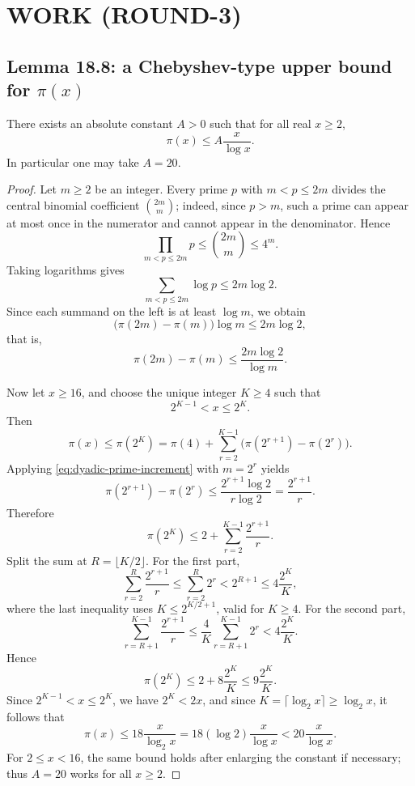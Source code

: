 \section{WORK (ROUND-3)}

\subsection{Lemma 18.8: a Chebyshev-type upper bound for \(\pi(x)\)}

\begin{lemma}[Lemma~18.8]\label{lem:pi-upper}
There exists an absolute constant \(A>0\) such that for all real \(x\ge 2\),
\[
\pi(x) \le A\frac{x}{\log x}.
\]
In particular one may take \(A=20\).
\end{lemma}

\begin{proof}
Let \(m\ge 2\) be an integer. Every prime \(p\) with \(m<p\le 2m\) divides the central binomial coefficient \(\binom{2m}{m}\); indeed, since \(p>m\), such a prime can appear at most once in the numerator and cannot appear in the denominator. Hence
\[
\prod_{m<p\le 2m} p \le \binom{2m}{m} \le 4^m.
\]
Taking logarithms gives
\[
\sum_{m<p\le 2m} \log p \le 2m\log 2.
\]
Since each summand on the left is at least \(\log m\), we obtain
\[
\bigl(\pi(2m)-\pi(m)\bigr)\log m \le 2m\log 2,
\]
that is,
\begin{equation}\label{eq:dyadic-prime-increment}
\pi(2m)-\pi(m) \le \frac{2m\log 2}{\log m}.
\end{equation}

Now let \(x\ge 16\), and choose the unique integer \(K\ge 4\) such that
\[
2^{K-1}<x\le 2^K.
\]
Then
\[
\pi(x)\le \pi(2^K)=\pi(4)+\sum_{r=2}^{K-1}\bigl(\pi(2^{r+1})-\pi(2^r)\bigr).
\]
Applying \eqref{eq:dyadic-prime-increment} with \(m=2^r\) yields
\[
\pi(2^{r+1})-\pi(2^r)\le \frac{2^{r+1}\log 2}{r\log 2}=\frac{2^{r+1}}{r}.
\]
Therefore
\[
\pi(2^K)\le 2+\sum_{r=2}^{K-1}\frac{2^{r+1}}{r}.
\]
Split the sum at \(R=\lfloor K/2\rfloor\). For the first part,
\[
\sum_{r=2}^{R}\frac{2^{r+1}}{r}
\le \sum_{r=2}^{R}2^r
<2^{R+1}
\le 4\frac{2^K}{K},
\]
where the last inequality uses \(K\le 2^{K/2+1}\), valid for \(K\ge 4\).
For the second part,
\[
\sum_{r=R+1}^{K-1}\frac{2^{r+1}}{r}
\le \frac{4}{K}\sum_{r=R+1}^{K-1}2^r
<4\frac{2^K}{K}.
\]
Hence
\[
\pi(2^K)\le 2+8\frac{2^K}{K}\le 9\frac{2^K}{K}.
\]
Since \(2^{K-1}<x\le 2^K\), we have \(2^K<2x\), and since \(K=\lceil \log_2 x\rceil\ge \log_2 x\), it follows that
\[
\pi(x)\le 18\frac{x}{\log_2 x}=18(\log 2)\frac{x}{\log x}<20\frac{x}{\log x}.
\]
For \(2\le x<16\), the same bound holds after enlarging the constant if necessary; thus \(A=20\) works for all \(x\ge 2\).
\end{proof}

